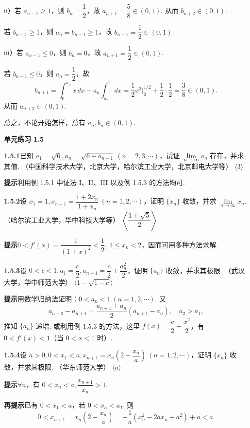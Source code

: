 \documentclass[UTF8,12pt,a4paper,fontset=fandol]{ctexart}
\begin{document}
ii）若 $a_{n-1}\ge 1$，则 $b_n=\dfrac12$，故 $a_{n+1}=\dfrac58\in (0,1)$. 从而 $b_{n+2}\in (0,1)$.

若 $b_{n-1}\ge 1$，则 $a_n=b_{n-1}\ge 1$，故 $b_{n+1}=\dfrac12\in (0,1)$.

iii）若 $a_{n-1}\le 0$，则 $b_n=0$，故 $a_{n+1}=\dfrac12\in (0,1)$.

若 $b_{n-1}\le 0$，则 $a_n=\dfrac12$，故
\[
  b_{n+1}=\int_0^{a_n}x\,dx+a_n\int_{a_n}^1dx
  =\frac12x^2\bigg|_0^{1/2}+\frac12\cdot \frac12
  =\frac38\in (0,1).
\]
从而 $a_{n+2}\in (0,1)$.

总之，不论开始怎样，总有 $a_n,b_n\in (0,1)$.

\noindent\textbf{单元练习 1.5}

\noindent\textbf{1.5.1}\quad 已知 $a_1=\sqrt6,a_n=\sqrt{6+a_{n-1}}\ (n=2,3,\cdots)$，试证 $\lim\limits_{n\to\infty}a_n$ 存在，并求其值. （中国科学技术大学，北京大学，哈尔滨工业大学，北京邮电大学等） \hfill $\langle 3\rangle$

\noindent\textbf{提示}\quad 利用例 1.5.1 中证法 I、II、III 以及例 1.5.3 的方法均可.

\noindent\textbf{1.5.2}\quad 设 $x_1=1,x_{n+1}=\dfrac{1+2x_n}{1+x_n}\ (n=1,2,\cdots)$，证明 $\{x_n\}$ 收敛，并求 $\lim\limits_{n\to\infty}x_n$. （哈尔滨工业大学，华中科技大学等） \hfill $\left\langle \dfrac{1+\sqrt5}{2}\right\rangle$

\noindent\textbf{提示}\quad $0<f'(x)=\dfrac1{(1+x)^2}<\dfrac12,\ 1\le x_n<2$，因而可用多种方法求解.

\noindent\textbf{1.5.3}\quad 设 $0<c<1,a_1=\dfrac c2,a_{n+1}=\dfrac c2+\dfrac{a_n^2}{2}$，证明 $\{a_n\}$ 收敛，并求其极限. （武汉大学，华中师范大学） \hfill $\langle 1-\sqrt{1-c}\rangle$

\noindent\textbf{提示}\quad 用数学归纳法证明：$0<a_n<1\ (n=1,2,\cdots)$. 又
\[
  a_{n+2}-a_{n+1}=\frac{a_{n+1}+a_n}{2}(a_{n+1}-a_n),\quad a_2>a_1,
\]
推知 $\{a_n\}$ 递增. 或利用例 1.5.3 的方法，这里 $f(x)=\dfrac c2+\dfrac{x^2}{2}$，有 $0<f'(x)<1$（当 $0<x<1$ 时）.

\noindent\textbf{1.5.4}\quad 设 $a>0,0<x_1<a,x_{n+1}=x_n\left(2-\dfrac{x_n}{a}\right)\ (n=1,2,\cdots)$，证明 $\{x_n\}$ 收敛，并求其极限. （华东师范大学） \hfill $\langle a\rangle$

\noindent\textbf{提示}\quad $\forall n$，有 $0<x_n<a,\dfrac{x_{n+1}}{x_n}>1$.

\noindent\textbf{再提示}\quad 已有 $0<x_1<a$，若 $0<x_n<a$，则
\[
  0<x_{n+1}=x_n\left(2-\frac{x_n}{a}\right)
  =-\frac1a(x_n^2-2ax_n+a^2)+a<a.
\]
\end{document}
